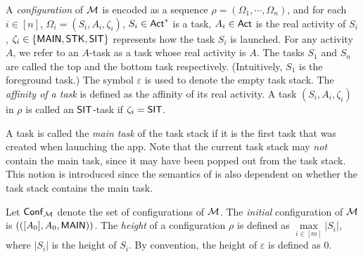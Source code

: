 A \emph{configuration} of ${\mathcal{M} }$ is encoded as a sequence 
$\rho=(\Omega_1,\cdots,\Omega_n)$, and for each $i \in [n]$, $\Omega_i = (S_i,A_i,\zeta_i)$, $S_i\in{\sf Act}^*$ is a task, $A_i\in{\sf Act}$ is the real activity of $S_i$, $\zeta_i\in\{{\sf MAIN},{\sf STK},{\sf SIT}\}$ represents how the task $S_i$ is launched. 
For any activity $A$, we refer to an $A$-task as a task whose real activity is $A$. 
%
The tasks $S_1$ and $S_n$ are called the top and the bottom task respectively. (Intuitively, $S_1$ is the foreground  task.) The symbol $\varepsilon$ is used to denote the empty task stack. 
The \emph{affinity of a task} is defined as the affinity of its real activity. A task $(S_i,A_i,\zeta_i)$ in $\rho$ is called an ${\sf SIT}$-task if $\zeta_i = {\sf SIT}$. 

A task is called the \emph{main task} of the task stack if it is the first task that was created when launching the app. Note that the current task stack may \emph{not} contain the main task, since it may have been popped out from the task stack. This notion is introduced since the semantics of {\AMASS} is also dependent on whether the task stack contains the main task.

Let ${\mathsf{Conf} }_{\mathcal{M} }$ denote the set of configurations of ${\mathcal{M} }$. The \emph{initial} configuration of ${\mathcal{M} }$ is $(([A_0],A_0,{\sf MAIN}))$. 
%
The \emph{height} of a configuration $\rho$ %
is defined as $\max \limits_{i \in [m]}|S_i|$, where $|S_i|$ is the height of $S_i$. By convention, the height of $\varepsilon$ is defined as $0$. 

